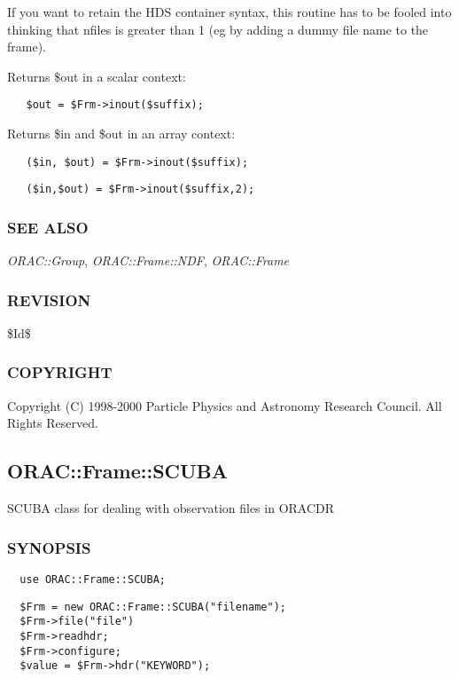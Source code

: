 \begin{description}
\begin{description}
\begin{description}
If you want to retain the HDS container syntax, this routine has to be
fooled into thinking that nfiles is greater than 1 (eg by adding a dummy
file name to the frame).



Returns \$out in a scalar context:

\begin{verbatim}
   $out = $Frm->inout($suffix);
\end{verbatim}


Returns \$in and \$out in an array context:

\begin{verbatim}
   ($in, $out) = $Frm->inout($suffix);
\end{verbatim}
\begin{verbatim}
   ($in,$out) = $Frm->inout($suffix,2);
\end{verbatim}
\end{description}
\subsubsection*{SEE ALSO\label{ORAC::Frame::UKIRT_SEE_ALSO}}


\emph{ORAC::Group}, \emph{ORAC::Frame::NDF}, \emph{ORAC::Frame}

\subsubsection*{REVISION\label{ORAC::Frame::UKIRT_REVISION}}


\$Id\$

\subsubsection*{COPYRIGHT\label{ORAC::Frame::UKIRT_COPYRIGHT}}


Copyright (C) 1998-2000 Particle Physics and Astronomy Research
Council. All Rights Reserved.

\subsection{ORAC::Frame::SCUBA\label{ORAC::Frame::SCUBA}}


SCUBA class for dealing with observation files in ORACDR

\subsubsection*{SYNOPSIS\label{ORAC::Frame::SCUBA_SYNOPSIS}}
\begin{verbatim}
  use ORAC::Frame::SCUBA;
\end{verbatim}
\begin{verbatim}
  $Frm = new ORAC::Frame::SCUBA("filename");
  $Frm->file("file")
  $Frm->readhdr;
  $Frm->configure;
  $value = $Frm->hdr("KEYWORD");
\end{verbatim}

\end{description}
\end{description}
